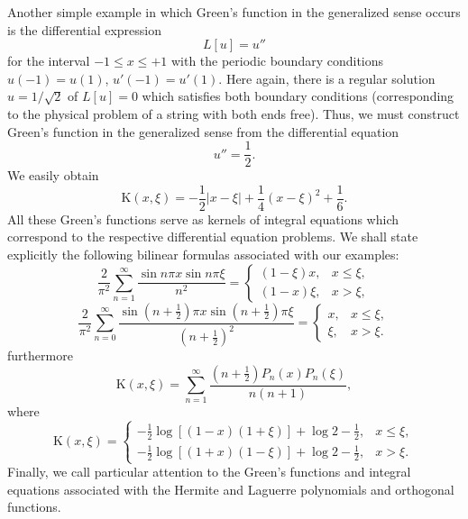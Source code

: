 Another simple example in which Green's function in the generalized sense occurs is the differential expression
\[
L[u]=u''
\]
for the interval $-1\le x\le+1$ with the periodic boundary conditions $u(-1)=u(1)$, $u'(-1)=u'(1)$. Here again, there is a regular solution $u=1/\sqrt2$ of $L[u]=0$ which satisfies both boundary conditions (corresponding to the physical problem of a string with both ends free). Thus, we must construct Green's function in the generalized sense from the differential equation
\[
u''=\frac12.
\]
We easily obtain
\[
\mathrm K(x,\xi)=-\frac12|x-\xi|+\frac14(x-\xi)^2+\frac16.
\]
All these Green's functions serve as kernels of integral equations which correspond to the respective differential equation problems. We shall state explicitly the following bilinear formulas associated with our examples:
\[
\frac{2}{\pi^2}\sum_{n=1}^{\infty}\frac{\sin n\pi x\sin n\pi\xi}{n^2}
=
\begin{cases}
(1-\xi)x,&x\le\xi,\\
(1-x)\xi,&x>\xi,
\end{cases}
\]
\[
\frac{2}{\pi^2}\sum_{n=0}^{\infty}\frac{\sin(n+\frac12)\pi x\sin(n+\frac12)\pi\xi}{(n+\frac12)^2}
=
\begin{cases}
x,&x\le\xi,\\
\xi,&x>\xi.
\end{cases}
\]
furthermore
\[
\mathrm K(x,\xi)=\sum_{n=1}^{\infty}\frac{(n+\frac12)P_n(x)P_n(\xi)}{n(n+1)},
\]
where
\[
\mathrm K(x,\xi)=
\begin{cases}
-\frac12\log[(1-x)(1+\xi)]+\log2-\frac12,&x\le\xi,\\
-\frac12\log[(1+x)(1-\xi)]+\log2-\frac12,&x>\xi.
\end{cases}
\]
Finally, we call particular attention to the Green's functions and integral equations associated with the Hermite and Laguerre polynomials and orthogonal functions.

